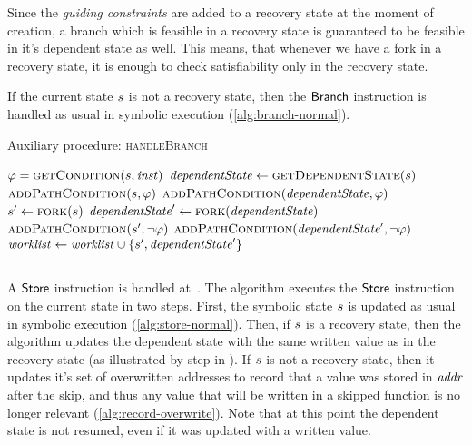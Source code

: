 Since the \textit{guiding constraints} are added to a recovery state at the moment of creation,
a branch which is feasible in a recovery state is guaranteed to be feasible in it's dependent state as well.
This means, that whenever we have a fork in a recovery state,
it is enough to check satisfiability only in the recovery state.

If the current state $s$ is not a recovery
state, then the $\mathsf{Branch}$ instruction is handled as usual in
symbolic execution (\cref{alg:branch-normal}).

\begin{algorithm}
  \caption{Auxiliary procedure: \textsc{handleBranch}
  \label{fig:aux-handle-branch}}
\begin{algorithmic}[1]

 \label{alg:branch-check-recovery}
  \State $\varphi = \Call{getCondition}{\workstate, \inst}$  \label{alg:branch-get-cond}
  \State $\dependentState \gets  \Call{getDependentState}{\workstate}$ \label{alg:get-dependent}
   \label{alg:branch-feasible-true}
    \State $\Call{addPathCondition}{\workstate, \varphi}$ \label{alg:add-pc-true-recS}
    \State $\Call{addPathCondition}{\dependentState, \varphi}$ \label{alg:add-pc-true-depS}
  \EndIf
   \label{alg:branch-feasible-false}
    \State $\workstate' \gets \Call{fork}{\workstate}$ \label{alg:branch-fork-false1}
    \State $\dependentState' \gets \Call{fork}{\dependentState}$ \label{alg:branch-fork-false2}
    \State $\Call{addPathCondition}{\workstate', \neg \varphi}$ \label{alg:add-pc-false-recS}
    \State $\Call{addPathCondition}{\dependentState', \neg \varphi}$ \label{alg:add-pc-false-depS}
    \State $\mathit{worklist} \gets \mathit{worklist} \cup \{s', \mathit{dependentState}'\}$ \label{alg:push-both}
  \EndIf
\Else
  \State {}  \label{alg:branch-normal}
\EndIf
\EndFunction
\end{algorithmic}
\end{algorithm}

\subsection{}
A $\mathsf{Store}$ instruction is handled at~.
The algorithm executes the $\mathsf{Store}$ instruction on the
current state in two steps.
First, the symbolic state $s$ is updated as usual in symbolic execution (\cref{alg:store-normal}).
Then, if $s$ is a recovery state, then the algorithm
updates the dependent state with the same written value as in the recovery state
(as illustrated by step  in ).
If $s$ is not a recovery state,
then it updates it's set of overwritten addresses to record
that a value was stored in $\mathit{addr}$ after the skip,
and thus any value that will be written in a skipped function
is no longer relevant (\cref{alg:record-overwrite}). 
Note that at this point the dependent state is not resumed,
even if it was updated with a written value.

